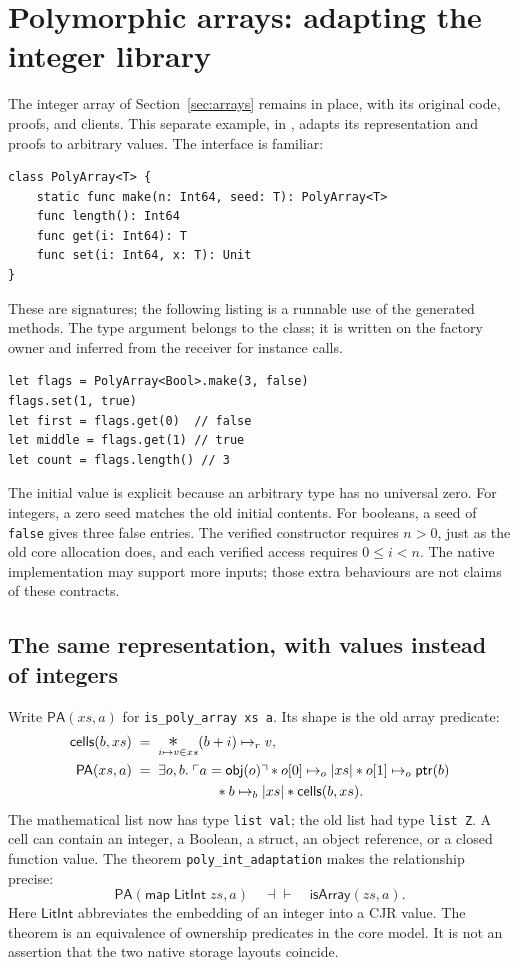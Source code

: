 \section{Polymorphic arrays: adapting the integer library}
\label{sec:poly-arrays}

The integer array of Section~\ref{sec:arrays} remains in place, with its
original code, proofs, and clients. This separate example, in
, adapts its representation and
proofs to arbitrary values. The interface is familiar:
\begin{lstlisting}
class PolyArray<T> {
    static func make(n: Int64, seed: T): PolyArray<T>
    func length(): Int64
    func get(i: Int64): T
    func set(i: Int64, x: T): Unit
}
\end{lstlisting}
These are signatures; the following listing is a runnable use of the
generated methods. The type argument belongs to the class; it is written
on the factory owner and inferred from the receiver for instance calls.
\begin{lstlisting}
let flags = PolyArray<Bool>.make(3, false)
flags.set(1, true)
let first = flags.get(0)  // false
let middle = flags.get(1) // true
let count = flags.length() // 3
\end{lstlisting}
The initial value is explicit because an arbitrary type has no universal
zero. For integers, a zero seed matches the old initial contents. For booleans, a seed of \texttt{false} gives three false
entries. The verified constructor requires $n>0$, just as the old core
allocation does, and each verified access requires $0\leq i<n$.
The native implementation may support more inputs; those extra behaviours
are not claims of these contracts.

\subsection{The same representation, with values instead of integers}

Write $\mathsf{PA}(xs,a)$ for \texttt{is\_poly\_array xs a}. Its shape is
the old array predicate:
\[
\begin{aligned}
\mathsf{cells}(b,xs) &\;=\;
  \bigsep_{i\mapsto v\in xs} (b+i)\ptsr v,\\
\mathsf{PA}(xs,a) &\;=\;\exists o,b.\;
  \pure{a=\mathsf{obj}(o)}\sep
  o[0]\ptso |xs|\sep o[1]\ptso\mathsf{ptr}(b)\\
 &\hspace{6em}\sep b\ptsb |xs|\sep\mathsf{cells}(b,xs).
\end{aligned}
\]
The mathematical list now has type \texttt{list val}; the old list had
type \texttt{list Z}. A cell can contain an integer, a Boolean, a struct,
an object reference, or a closed function value. The theorem
\texttt{poly\_int\_adaptation} makes the relationship precise:
\[
\mathsf{PA}(\mathsf{map}\;\mathsf{LitInt}\;zs,a)
\quad\dashv\vdash\quad \mathsf{isArray}(zs,a).
\]
Here $\mathsf{LitInt}$ abbreviates the embedding of an integer into a CJR
value. The theorem is an equivalence of ownership predicates in the core
model. It is not an assertion that the two native storage layouts coincide.

